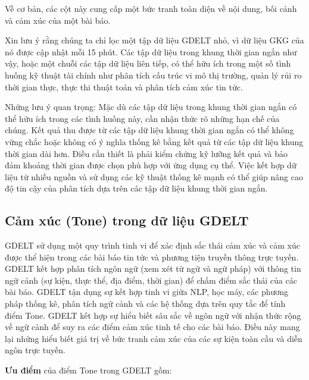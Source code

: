 Về cơ bản, các cột này cung cấp một bức tranh toàn diện về nội dung, bối cảnh và cảm xúc của một bài báo.

Xin lưu ý rằng chúng ta chỉ lọc một tập dữ liệu GDELT nhỏ, vì dữ liệu GKG của nó được cập nhật mỗi 15 phút. Các tập dữ liệu trong khung thời gian ngắn như vậy, hoặc một chuỗi các tập dữ liệu liên tiếp, có thể hữu ích trong một số tình huống kỹ thuật tài chính như phân tích cấu trúc vi mô thị trường, quản lý rủi ro thời gian thực, thực thi thuật toán và phân tích cảm xúc tin tức.

Những lưu ý quan trọng: Mặc dù các tập dữ liệu trong khung thời gian ngắn có thể hữu ích trong các tình huống này, cần nhận thức rõ những hạn chế của chúng. Kết quả thu được từ các tập dữ liệu khung thời gian ngắn có thể không vững chắc hoặc không có ý nghĩa thống kê bằng kết quả từ các tập dữ liệu khung thời gian dài hơn. Điều cần thiết là phải kiểm chứng kỹ lưỡng kết quả và bảo đảm khoảng thời gian được chọn phù hợp với ứng dụng cụ thể. Việc kết hợp dữ liệu từ nhiều nguồn và sử dụng các kỹ thuật thống kê mạnh có thể giúp nâng cao độ tin cậy của phân tích dựa trên các tập dữ liệu khung thời gian ngắn.

\subsection{Cảm xúc (Tone) trong dữ liệu GDELT}

GDELT sử dụng một quy trình tinh vi để xác định sắc thái cảm xúc và cảm xúc được thể hiện trong các bài báo tin tức và phương tiện truyền thông trực tuyến. GDELT kết hợp phân tích ngôn ngữ (xem xét từ ngữ và ngữ pháp) với thông tin ngữ cảnh (sự kiện, thực thể, địa điểm, thời gian) để chấm điểm sắc thái của các bài báo. GDELT tận dụng sự kết hợp tinh vi giữa NLP, học máy, các phương pháp thống kê, phân tích ngữ cảnh và các hệ thống dựa trên quy tắc để tính điểm Tone. GDELT kết hợp sự hiểu biết sâu sắc về ngôn ngữ với nhận thức rộng về ngữ cảnh để suy ra các điểm cảm xúc tinh tế cho các bài báo. Điều này mang lại những hiểu biết giá trị về bức tranh cảm xúc của các sự kiện toàn cầu và diễn ngôn trực tuyến.

\textbf{Ưu điểm} của điểm Tone trong GDELT gồm:

